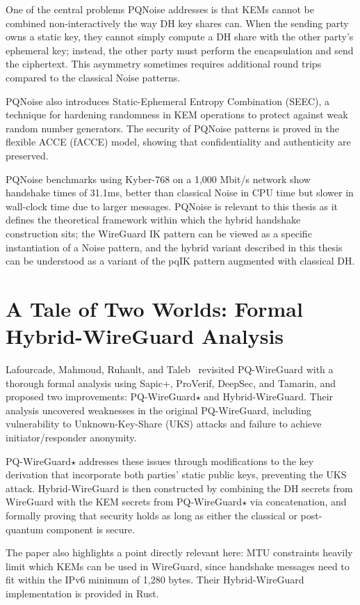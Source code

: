 One of the central problems PQNoise addresses is that KEMs cannot be combined non-interactively the way DH key shares can. When the sending party owns a static key, they cannot simply compute a DH share with the other party's ephemeral key; instead, the other party must perform the encapsulation and send the ciphertext. This asymmetry sometimes requires additional round trips compared to the classical Noise patterns.

PQNoise also introduces Static-Ephemeral Entropy Combination (SEEC), a technique for hardening randomness in KEM operations to protect against weak random number generators. The security of PQNoise patterns is proved in the flexible ACCE (fACCE) model, showing that confidentiality and authenticity are preserved.

PQNoise benchmarks using Kyber-768 on a 1,000 Mbit/s network show handshake times of 31.1ms, better than classical Noise in CPU time but slower in wall-clock time due to larger messages. PQNoise is relevant to this thesis as it defines the theoretical framework within which the hybrid handshake construction sits; the WireGuard IK pattern can be viewed as a specific instantiation of a Noise pattern, and the hybrid variant described in this thesis can be understood as a variant of the pqIK pattern augmented with classical DH.

\section{A Tale of Two Worlds: Formal Hybrid-WireGuard Analysis}

Lafourcade, Mahmoud, Ruhault, and Taleb~\cite{lafourcade2025hybrid} revisited PQ-WireGuard with a thorough formal analysis using Sapic+, ProVerif, DeepSec, and Tamarin, and proposed two improvements: PQ-WireGuard$\star$ and Hybrid-WireGuard. Their analysis uncovered weaknesses in the original PQ-WireGuard, including vulnerability to Unknown-Key-Share (UKS) attacks and failure to achieve initiator/responder anonymity.

PQ-WireGuard$\star$ addresses these issues through modifications to the key derivation that incorporate both parties' static public keys, preventing the UKS attack. Hybrid-WireGuard is then constructed by combining the DH secrets from WireGuard with the KEM secrets from PQ-WireGuard$\star$ via concatenation, and formally proving that security holds as long as either the classical or post-quantum component is secure.

The paper also highlights a point directly relevant here: MTU constraints heavily limit which KEMs can be used in WireGuard, since handshake messages need to fit within the IPv6 minimum of 1,280 bytes. Their Hybrid-WireGuard implementation is provided in Rust.

